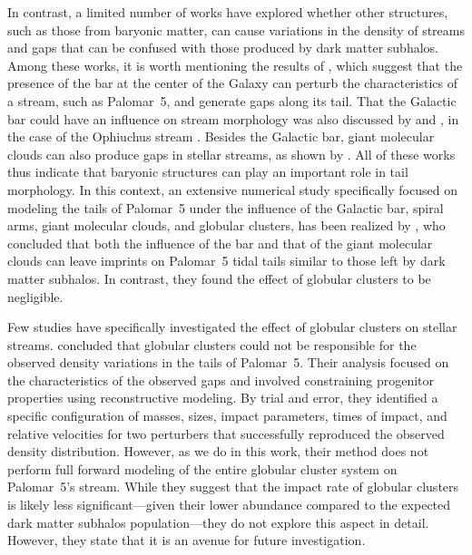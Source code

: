   In contrast, a limited number of works have explored whether other structures, such as those from baryonic matter, can cause variations in the density of streams and gaps that can be confused with those produced by dark matter subhalos.  Among these works, it is worth mentioning the results of \citet{2017NatAs...1..633P}, which suggest that the presence of the bar at the center of the Galaxy can perturb the characteristics of a stream, such as Palomar~5, and generate gaps along its tail. That the Galactic bar could have an influence on stream morphology was also discussed by \citet{2016MNRAS.460..497H} and \citet{2016ApJ...824..104P}, in the case of the Ophiuchus stream \citep{2014MNRAS.443L..84B}. Besides the Galactic bar, giant molecular clouds can also produce gaps in stellar streams, as shown by \citet{2016MNRAS.463L..17A}. All of these works thus indicate that baryonic structures can play an important role in tail morphology. In this context,  an extensive numerical study specifically focused on modeling the tails of Palomar~5 under the influence of the Galactic bar, spiral arms, giant molecular clouds, and globular clusters, has been realized by \citet{2019MNRAS.484.2009B}, who concluded that both the influence of the bar and that of the giant molecular clouds can leave imprints on Palomar~5 tidal tails similar to those left by dark matter subhalos. In contrast, they found the effect of globular clusters to be negligible. 
  
  Few studies have specifically investigated the effect of globular clusters on stellar streams. \citet{2017MNRAS.470...60E} concluded that globular clusters could not be responsible for the observed density variations in the tails of Palomar~5. Their analysis focused on the characteristics of the observed gaps and involved constraining progenitor properties using reconstructive modeling. By trial and error, they identified a specific configuration of masses, sizes, impact parameters, times of impact, and relative velocities for two perturbers that successfully reproduced the observed density distribution. However, as we do in this work, their method does not perform full forward modeling of the entire globular cluster system on Palomar~5's stream. While they suggest that the impact rate of globular clusters is likely less significant---given their lower abundance compared to the expected dark matter subhalos population---they do not explore this aspect in detail. However, they state that it is an avenue for future investigation. 
  
